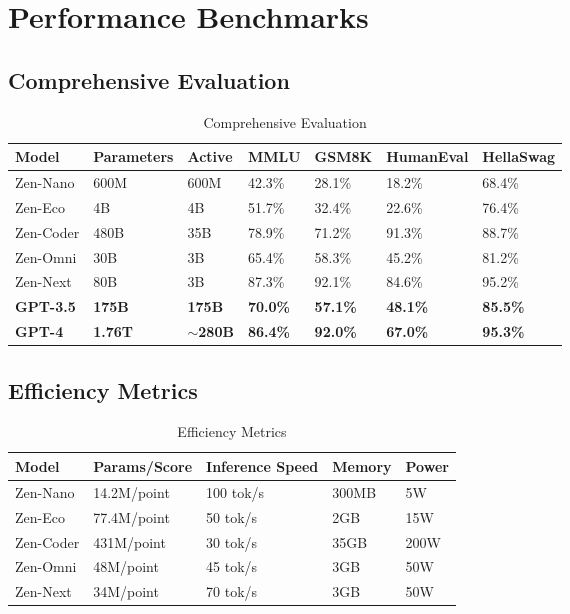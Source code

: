 \documentclass[11pt,a4paper]{article}
\begin{document}
\section{Performance Benchmarks}

\subsection{Comprehensive Evaluation}

\begin{table}[H]
\centering
\begin{tabular}{lllllll}
\toprule
\textbf{Model} & \textbf{Parameters} & \textbf{Active} & \textbf{MMLU} & \textbf{GSM8K} & \textbf{HumanEval} & \textbf{HellaSwag} \\
\midrule
Zen-Nano & 600M & 600M & 42.3\% & 28.1\% & 18.2\% & 68.4\% \\
Zen-Eco & 4B & 4B & 51.7\% & 32.4\% & 22.6\% & 76.4\% \\
Zen-Coder & 480B & 35B & 78.9\% & 71.2\% & 91.3\% & 88.7\% \\
Zen-Omni & 30B & 3B & 65.4\% & 58.3\% & 45.2\% & 81.2\% \\
Zen-Next & 80B & 3B & 87.3\% & 92.1\% & 84.6\% & 95.2\% \\
\textbf{GPT-3.5} & \textbf{175B} & \textbf{175B} & \textbf{70.0\%} & \textbf{57.1\%} & \textbf{48.1\%} & \textbf{85.5\%} \\
\textbf{GPT-4} & \textbf{1.76T} & \textbf{$\sim$280B} & \textbf{86.4\%} & \textbf{92.0\%} & \textbf{67.0\%} & \textbf{95.3\%} \\
\bottomrule
\end{tabular}
\caption{Comprehensive Evaluation}
\end{table}

\subsection{Efficiency Metrics}

\begin{table}[H]
\centering
\begin{tabular}{lllll}
\toprule
\textbf{Model} & \textbf{Params/Score} & \textbf{Inference Speed} & \textbf{Memory} & \textbf{Power} \\
\midrule
Zen-Nano & 14.2M/point & 100 tok/s & 300MB & 5W \\
Zen-Eco & 77.4M/point & 50 tok/s & 2GB & 15W \\
Zen-Coder & 431M/point & 30 tok/s & 35GB & 200W \\
Zen-Omni & 48M/point & 45 tok/s & 3GB & 50W \\
Zen-Next & 34M/point & 70 tok/s & 3GB & 50W \\
\bottomrule
\end{tabular}
\caption{Efficiency Metrics}
\end{table}
\end{document}
